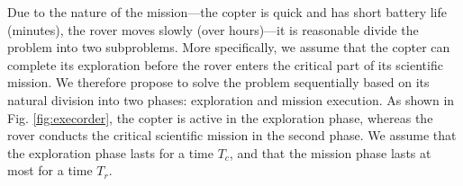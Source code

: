 \documentclass[conference]{IEEEtran}
\begin{document}
Due to the nature of the mission---the copter is quick and has short battery life (minutes), the rover moves slowly (over hours)---it is reasonable divide the problem into two subproblems. More specifically, we assume that the copter can complete its exploration before the rover enters the critical part of its scientific mission. We therefore propose to solve the problem sequentially based on its natural division into two phases: exploration and mission execution. As shown in Fig. \ref{fig:execorder}, the copter is active in the exploration phase, whereas the rover conducts the critical scientific mission in the second phase. We assume that the exploration phase lasts for a time $T_c$, and that the mission phase lasts at most for a time $T_r$.
%
%
%
%
%
%
%
%
%
\end{document}

